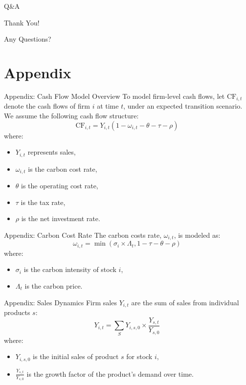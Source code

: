 \documentclass{beamer}
\begin{document}
\begin{frame}{Q\&A}
  \Huge{\centerline{Thank You!}}
  \Huge{\centerline{Any Questions?}}
\end{frame}

\appendix

\section*{Appendix}

\begin{frame}{Appendix: Cash Flow Model Overview}
  To model firm-level cash flows, let $\text{CF}_{i,t}$ denote the cash flows of firm $ i $ at time $ t $, under an expected transition scenario. We assume the following cash flow structure:
  \begin{equation}
    \text{CF}_{i,t} = Y_{i,t} (1 - \omega_{i,t} - \theta - \tau - \rho)
  \end{equation}
  where:
  \begin{itemize}
    \item $ Y_{i,t} $ represents sales,
    \item $ \omega_{i,t} $ is the carbon cost rate,
    \item $ \theta $ is the operating cost rate,
    \item $ \tau $ is the tax rate,
    \item $ \rho $ is the net investment rate.
  \end{itemize}
\end{frame}

\begin{frame}{Appendix: Carbon Cost Rate}
  The carbon costs rate, $ \omega_{i,t} $, is modeled as:
  \begin{equation}
    \omega_{i,t} = \min(\sigma_i \times \Lambda_t, 1 - \tau - \theta - \rho)
  \end{equation}
  where:
  \begin{itemize}
    \item $ \sigma_i $ is the carbon intensity of stock $ i $,
    \item $ \Lambda_t $ is the carbon price.
  \end{itemize}
\end{frame}

\begin{frame}{Appendix: Sales Dynamics}
  Firm sales $ Y_{i,t} $ are the sum of sales from individual products $ s $:
  \begin{equation}
    Y_{i,t} = \sum_{S} Y_{i,s,0} \times \frac{Y_{s,t}}{Y_{s,0}}
  \end{equation}
  where:
  \begin{itemize}
    \item $ Y_{i,s,0} $ is the initial sales of product $ s $ for stock $ i $,
    \item $ \frac{Y_{s,t}}{Y_{s,0}} $ is the growth factor of the product’s demand over time.
  \end{itemize}
\end{frame}
\end{document}
